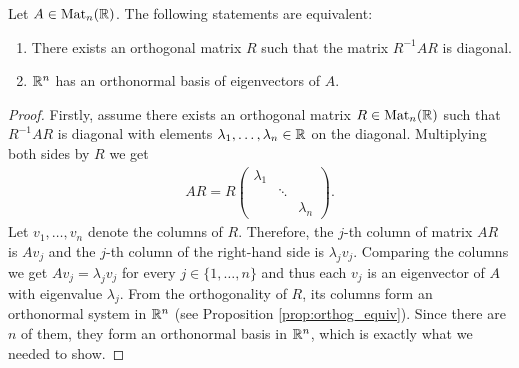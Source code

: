 \begin{prop}\label{prop:spec_the_II}
    Let $A\in\text{Mat}_n(\mathbb{R})$. The following statements are equivalent:
    \begin{enumerate}
        \renewcommand{\labelenumi}{(\roman*)}
        \item There exists an orthogonal matrix $R$ such that the matrix $R^{-1}AR$ is diagonal.
        \item $\mathbb{R}^n$ has an orthonormal basis of eigenvectors of $A$. 
    \end{enumerate}
\end{prop}
\begin{proof}
    Firstly, assume there exists an orthogonal matrix $R\in\text{Mat}_n(\mathbb{R})$ such that $R^{-1}AR$ is diagonal with elements $\lambda_1,\dots,\lambda_n\in\mathbb{R}$ on the diagonal. Multiplying both sides by $R$ we get 
    \begin{gather*}
        AR = R
        \begin{pmatrix}
            \lambda_{1} & & \\
            & \ddots & \\
            & & \lambda_{n}
        \end{pmatrix}.
    \end{gather*}
    Let $v_1,\dots,v_n$ denote the columns of $R$. Therefore, the $j$-th column of matrix $AR$ is $Av_j$ and the $j$-th column of the right-hand side is $\lambda_jv_j$. Comparing the columns we get $Av_j = \lambda_jv_j$ for every $j\in\{1,\dots, n\}$ and thus each $v_j$ is an eigenvector of $A$ with eigenvalue $\lambda_j$. From the orthogonality of $R$, its columns form an orthonormal system in $\mathbb{R}^n$ (see Proposition \ref{prop:orthog_equiv}). Since there are $n$ of them, they form an orthonormal basis in $\mathbb{R}^n$, which is exactly what we needed to show.


\end{proof}
